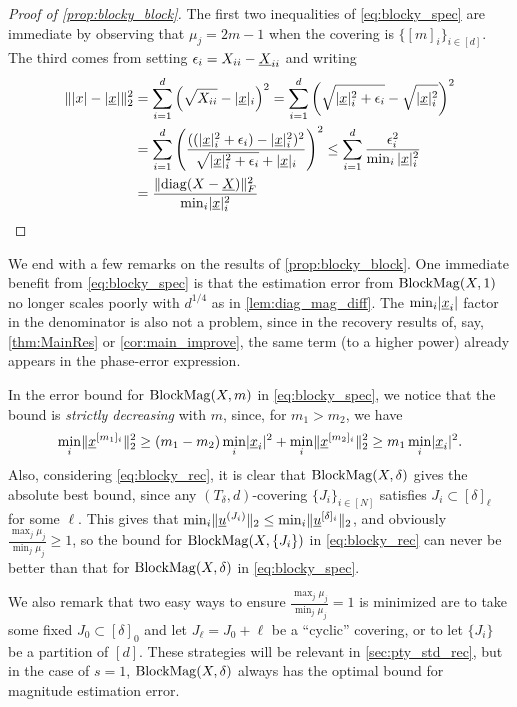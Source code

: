\begin{proof}[Proof of \cref{prop:blocky_block}]
  The first two inequalities of \eqref{eq:blocky_spec} are immediate by observing that $\mu_j = 2m - 1$ when the covering is $\{[m]_i\}_{i \in [d]}$.  The third comes from setting $\epsilon_i = X_{ii} - \underline{X}_{ii}$ and writing
  \begin{align*}
    \lVert\lvert x\rvert - \lvert\underline{x}\rvert\rVert_2^2 &= \sum_{i = 1}^d \left(\sqrt{X_{ii}} - \lvert\underline{x}\rvert_i\right)^2 = \sum_{i = 1}^d \left(\sqrt{\lvert\underline{x}\rvert_i^2 + \epsilon_i} - \sqrt{\lvert\underline{x}\rvert_i^2}\right)^2 \\
    &= \sum_{i = 1}^d \left(\frac{((\lvert\underline{x}\rvert_i^2 + \epsilon_i) - \lvert\underline{x}\rvert_i^2)^2}{\sqrt{\lvert\underline{x}\rvert_i^2 + \epsilon_i} + \lvert\underline{x}\rvert_i}\right)^2 \le \sum_{i = 1}^d \frac{\epsilon_i^2}{\min_i{\lvert\underline{x}\rvert_i^2}} \\ &= \frac{\lVert\operatorname{diag}(X - \underline{X})\rVert_F^2}{\min_i \lvert\underline{x}\rvert_i^2}
  \end{align*}  
\end{proof}

We end with a few remarks on the results of \cref{prop:blocky_block}.  One immediate benefit from \cref{eq:blocky_spec} is that the estimation error from $\operatorname{BlockMag}(X, 1)$ no longer scales poorly with $d^{1/4}$ as in \cref{lem:diag_mag_diff}.  The $\min_i \lvert\underline{x}_i\rvert$ factor in the denominator is also not a problem, since in the recovery results of, say, \cref{thm:MainRes} or \cref{cor:main_improve}, the same term (to a higher power) already appears in the phase-error expression.

In the error bound for $\operatorname{BlockMag}(X, m)$ in \cref{eq:blocky_spec}, we notice that the bound is \emph{strictly decreasing} with $m$, since, for $m_1 > m_2$, we have \[\min_i \lVert\underline{x}^{[m_1]_i}\rVert_2^2 \ge (m_1 - m_2) \min_i \lvert\underline{x}_i\rvert^2 + \min_i \lVert\underline{x}^{[m_2]_i}\rVert_2^2 \ge m_1 \min_i \lvert\underline{x}_i\rvert^2.\]  Also, considering \eqref{eq:blocky_rec}, it is clear that $\operatorname{BlockMag}(X, \delta)$ gives the absolute best bound, since any $(T_\delta, d)$-covering $\{J_i\}_{i \in [N]}$ satisfies $J_i \subset [\delta]_\ell$ for some $\ell$.  This gives that $\min_i \lVert\underline{u}^{(J_i)}\rVert_2 \le \min_i \lVert\underline{u}^{[\delta]_i}\rVert_2$, and obviously $\frac{\max_j \mu_j}{\min_j \mu_j} \ge 1$, so the bound for $\operatorname{BlockMag}(X, \{J_i\})$ in \eqref{eq:blocky_rec} can never be better than that for $\operatorname{BlockMag}(X, \delta)$ in \eqref{eq:blocky_spec}.

We also remark that two easy ways to ensure $\frac{\max_j \mu_j}{\min_j \mu_j} = 1$ is minimized are to take some fixed $J_0 \subset [\delta]_0$ and let $J_\ell = J_0 + \ell$ be a ``cyclic'' covering, or to let $\{J_i\}$ be a partition of $[d]$.  These strategies will be relevant in \cref{sec:pty_std_rec}, but in the case of $s = 1$, $\operatorname{BlockMag}(X, \delta)$ always has the optimal bound for magnitude estimation error.

